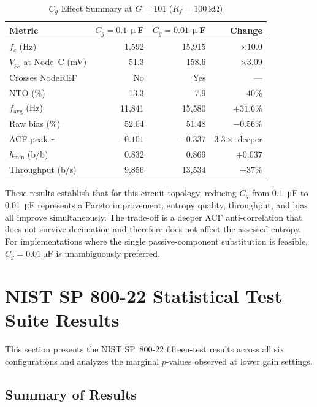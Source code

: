 \documentclass[conference]{IEEEtran}
\newcommand{\hmin}{\ensuremath{h_{\min}}}
\newcommand{\favg}{\ensuremath{f_{\mathrm{avg}}}}
\newcommand{\Cg}{\ensuremath{C_g}}
\newcommand{\Rf}{\ensuremath{R_f}}
\begin{document}
\begin{table}[t]
\caption{$\Cg$ Effect Summary at $G=101$ ($\Rf=\SI{100}{\kilo\ohm}$)}
\label{tab:cg}
\centering\small
\begin{tabular}{@{}lrrr@{}}
\toprule
Metric & $\Cg\!=\!0.1\,\upmu$F & $\Cg\!=\!0.01\,\upmu$F & Change \\
\midrule
$f_c$ (Hz)              & 1{,}592   & 15{,}915  & $\times 10.0$  \\
$V_{pp}$ at Node~C (mV) & 51.3      & 158.6     & $\times 3.09$  \\
Crosses NodeREF         & No        & Yes       & ---            \\
NTO (\%)            & 13.3      & 7.9       & $-40\%$        \\
$\favg$ (Hz)            & 11{,}841  & 15{,}580  & $+31.6\%$      \\
Raw bias (\%)           & 52.04     & 51.48     & $-0.56\%$      \\
ACF peak $r$            & $-0.101$  & $-0.337$  & $3.3\times$ deeper \\
$\hmin$ (b/b)           & 0.832     & 0.869     & $+0.037$       \\
Throughput (b/s)        & 9{,}856   & 13{,}534  & $+37\%$        \\
\bottomrule
\end{tabular}
\end{table}

These results establish that for this circuit topology, reducing
$\Cg$ from \SI{0.1}{\micro\farad} to \SI{0.01}{\micro\farad}
represents a Pareto improvement; entropy quality, throughput, and
bias all improve simultaneously. The trade-off is a deeper ACF
anti-correlation that does not survive decimation and therefore does
not affect the assessed entropy. For implementations where the single
passive-component substitution is feasible,
$\Cg=\SI{0.01}{\micro\farad}$ is unambiguously preferred.

\section{NIST SP 800-22 Statistical Test Suite Results}\label{sec:nist22}
This section presents the NIST SP~800-22 fifteen-test results across
all six configurations and analyzes the marginal $p$-values observed
at lower gain settings.
\subsection{Summary of Results}
\end{document}
